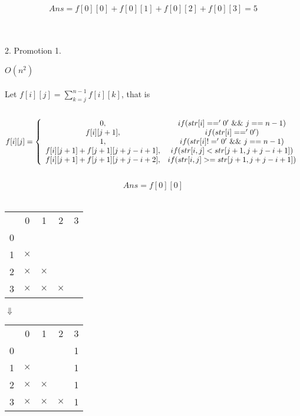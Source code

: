 \documentclass[a4paper,12pt]{article}
\begin{document}
\[
Ans = f[0][0] + f[0][1] + f[0][2] + f[0][3] = 5
\]
\\
\\
\begin{bfseries}
2. Promotion 1.
\end{bfseries}
$O(n^2)$ \\
\\
Let $f[i][j] = \sum_{k=j}^{n-1} f[i][k]$, that is \\
\\
\[
f[i][j] =
\left\{
    \begin{array}{c c}
        0, & if (str[i]=='0' \ \&\& \ j==n-1) \\
        f[i][j+1], & if (str[i]=='0') \\
        1, & if (str[i]!='0' \ \&\& \ j==n-1) \\
        f[i][j+1] + f[j+1][j+j-i+1], & if (str[i,j]<str[j+1,j+j-i+1]) \\
        f[i][j+1] + f[j+1][j+j-i+2], & if (str[i,j]>=str[j+1,j+j-i+1])
    \end{array}
\right.
\]
\\
\[
Ans = f[0][0]
\]
\\
\begin{center}
    \begin{tabular}{ r|c|c|c|c| }
        \multicolumn{1}{r}{} & \multicolumn{1}{c}{0} & \multicolumn{1}{c}{1} & \multicolumn{1}{c}{2} & \multicolumn{1}{c}{3}\\
        \cline{2-5}
        0 & \ & \ & \ & \ \\
        \cline{2-5}
        1 & $\times$ & \ & \ & \ \\
        \cline{2-5}
        2 & $\times$ & $\times$ & \ & \ \\
        \cline{2-5}
        3 & $\times$ & $\times$ & $\times$ & \ \\
        \cline{2-5}
    \end{tabular}
\end{center}

\begin{center}
$\Downarrow$
\end{center}

\begin{center}
    \begin{tabular}{ r|c|c|c|c| }
        \multicolumn{1}{r}{} & \multicolumn{1}{c}{0} & \multicolumn{1}{c}{1} & \multicolumn{1}{c}{2} & \multicolumn{1}{c}{3}\\
        \cline{2-5}
        0 & \ & \ & \ & 1 \\
        \cline{2-5}
        1 & $\times$ & \ & \ & 1 \\
        \cline{2-5}
        2 & $\times$ & $\times$ & \ & 1 \\
        \cline{2-5}
        3 & $\times$ & $\times$ & $\times$ & 1 \\
        \cline{2-5}
    \end{tabular}
\end{center}
\end{document}
